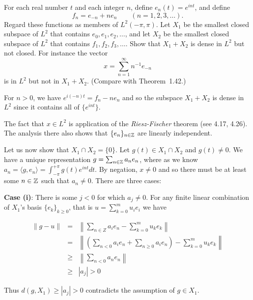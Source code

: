 \begin{enumerate}
\begin{excopy}
For each real number $t$ and each integer $n$, define \(e_n(t) = e^{int}\),
and define 
\begin{equation*}
  f_n = e_{-n} + ne_n \qquad (n=1,2,3,\ldots).
\end{equation*}
Regard these functions as members of \(L^2(-\pi,\pi)\).
Let \(X_1\) be the smallest closed subspace of \(L^2\) that contains 
\(e_0,e_1,e_2,\ldots\), and let \(X_2\) be the smallest closed subspace
of \(L^2\) that contains \(f_1,f_2,f_3,\ldots\). Show that \(X_1+X_2\)
is dense in \(L^2\) but not closed.
For instance the vector
\begin{equation*}
 x = \sum_{n=1}^\infty n^{-1}e_{-n}
\end{equation*}
is in \(L^2\) but not in \(X_1+X_2\). (Compare with Theorem~1.42.)
\end{excopy}

For \(n>0\), we have \(e^{i(-n)t} = f_n - n e_n\) and so
the subspace \(X_1+X_2\) is dense in \(L^2\) since it contains 
all of \(\{e^{int}\}\).


The fact that \(x\in L^2\) is application of the 
\emph{Riesz-Fischer} theorem (see \cite{RudinRCA80} 4.17, 4.26).
The analysis there also shows that \(\{e_n\}_{n\in\mathbb{Z}}\) are
linearly independent.


Let us now show that \(X_1\cap X_2 = \{0\}\).
Let \(g(t)\in X_1\cap X_2\) and \(g(t)\neq 0\).
We have a unique representation \(g=\sum_{n\in\mathbb{Z}} a_n e_n\),
where as we know 
\(a_n = \langle g,e_n\rangle = \int_{-\pi}^{+\pi} g(t)e^{int}dt\).
By negation, \(x\neq 0\) and so there must be at least some \(n\in\mathbb{Z}\)
such that \(a_n\neq 0\).
There are three cases:

\textbf{Case (i)}:  There is some \(j<0\) for which \(a_j\neq 0\).
For any finite linear combination of \(X_1\)'s basis \(\{e_k\}_{k\geq 0}\),
that is \(u = \sum_{k=0}^m u_i e_i\) we have

\begin{eqnarray*}
\|g - u\|
&=& \left\|\sum_{n\in Z} a_i e_n - \sum_{k=0}^m u_k e_k\right\| \\
&=& \left\|\left(\sum_{n<0} a_i e_n + \sum_{n\geq 0} a_i e_n\right)
          - \sum_{k=0}^m u_k e_k\right\| \\
&\geq & \left\| \sum_{n<0} a_n e_n\right\| \\
&\geq & | a_j | > 0
\end{eqnarray*}

Thus \(d(g,X_1) \geq |a_j| > 0\) contradicts the assumption of \(g\in X_1\).


\end{enumerate}
